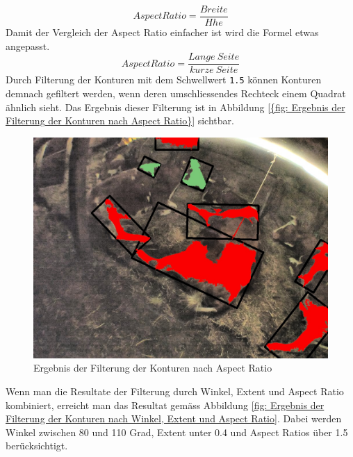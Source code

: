 \begin{equation}\label{Extent}
Aspect Ratio =  \frac{Breite}{H\ddot{}he}  
\end{equation}
Damit der Vergleich der Aspect Ratio einfacher ist wird die Formel etwas angepasst.
\begin{equation}\label{Extent}
Aspect Ratio =  \frac{Lange \ Seite}{kurze \ Seite}  
\end{equation}
Durch Filterung der Konturen mit dem Schwellwert \texttt{1.5} können Konturen demnach gefiltert werden, wenn deren umschliessendes Rechteck einem Quadrat ähnlich sieht. Das Ergebnis dieser Filterung ist in Abbildung \ref{{fig: Ergebnis der Filterung der Konturen nach Aspect Ratio}} sichtbar.
\begin{figure}[H]
	\center
	\includegraphics[scale=0.43]{Grafiken/entwicklung/27AspectRatio.jpg}
	\caption{Ergebnis der Filterung der Konturen nach Aspect Ratio } 
	\label{fig: Ergebnis der Filterung der Konturen nach Aspect Ratio Schwellwert=1.5} 
\end{figure}

Wenn man die Resultate der Filterung durch Winkel, Extent und Aspect Ratio kombiniert, erreicht man das Resultat gemäss Abbildung \ref{fig: Ergebnis der Filterung der Konturen nach Winkel, Extent und Aspect Ratio}. Dabei werden Winkel zwischen 80 und 110 Grad, Extent unter 0.4 und Aspect Ratios über 1.5 berücksichtigt.



